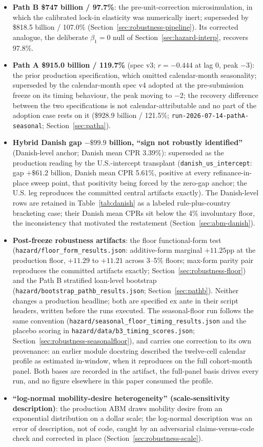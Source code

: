 \documentclass[12pt]{article}
\begin{document}
\begin{itemize}
\item \textbf{Path B \$747 billion / 97.7\%}: the pre-unit-correction microsimulation, in which the calibrated lock-in elasticity was numerically inert; superseded by \$818.5 billion / 107.0\% (Section~\ref{sec:robustness-pipeline}). Its corrected analogue, the deliberate $\beta_1 = 0$ null of Section~\ref{sec:hazard-interp}, recovers 97.8\%.
\item \textbf{Path A \$915.0 billion / 119.7\%} (spec v3; $r = -0.444$ at lag 0, peak $-3$): the prior production specification, which omitted calendar-month seasonality; superseded by the calendar-month spec v4 adopted at the pre-submission freeze on its timing behaviour, the peak moving to $-2$; the recovery difference between the two specifications is not calendar-attributable and no part of the adoption case rests on it (\$928.9 billion / 121.5\%; \texttt{run-2026-07-14-pathA-seasonal}; Section~\ref{sec:patha}).
\item \textbf{Hybrid Danish gap $-\$99.9$ billion, ``sign not robustly identified''} (Danish-level anchor; Danish mean CPR 3.39\%): superseded as the production reading by the U.S.-intercept transplant (\texttt{danish\_us\_intercept}: gap $+\$61.2$ billion, Danish mean CPR 5.61\%, positive at every refinance-in-place sweep point, that positivity being forced by the zero-gap anchor; the U.S. leg reproduces the committed central artifacts exactly). The Danish-level rows are retained in Table~\ref{tab:danish} as a labeled rule-plus-country bracketing case; their Danish mean CPRs sit below the 4\% involuntary floor, the inconsistency that motivated the restatement (Section~\ref{sec:abm-danish}).
\item \textbf{Post-freeze robustness artifacts}: the floor functional-form test (\texttt{hazard/floor\_form\_results.json}: additive-form marginal $+11.25$pp at the production floor, $+11.29$ to $+11.21$ across 3--5\% floors; max-form parity pair reproduces the committed artifacts exactly; Section~\ref{sec:robustness-floor}) and the Path B stratified loan-level bootstrap (\texttt{hazard/bootstrap\_pathb\_results.json}; Section~\ref{sec:pathb}). Neither changes a production headline; both are specified ex ante in their script headers, written before the runs executed. The seasonal-floor run follows the same convention (\texttt{hazard/seasonal\_floor\_timing\_results.json} and the placebo scoring in \texttt{hazard/data/b3\_timing\_scores.json}; Section~\ref{sec:robustness-seasonalfloor}), and carries one correction to its own provenance: an earlier module docstring described the twelve-cell calendar profile as estimated in-window, when it reproduces on the full cohort-month panel. Both bases are recorded in the artifact, the full-panel basis drives every run, and no figure elsewhere in this paper consumed the profile.
\item \textbf{``log-normal mobility-desire heterogeneity'' (scale-sensitivity description)}: the production ABM draws mobility desire from an exponential distribution on a dollar scale; the log-normal description was an error of description, not of code, caught by an adversarial claims-versus-code check and corrected in place (Section~\ref{sec:robustness-scale}).
\end{itemize}
\endgroup
\end{document}
